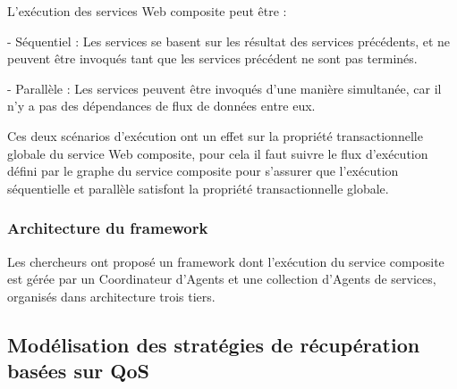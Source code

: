 L'exécution des services Web composite peut être \cite{3} : 

- Séquentiel : Les services se basent sur les résultat des services précédents, et ne peuvent être invoqués tant que les services précédent ne sont pas terminés.

- Parallèle : Les services peuvent être invoqués d'une manière simultanée, car il n'y a pas des dépendances de flux de données entre eux.

Ces deux scénarios d'exécution ont un effet sur la propriété transactionnelle globale du service Web composite, pour cela il faut suivre le flux d'exécution défini par le graphe du service composite pour s'assurer que l'exécution séquentielle et parallèle satisfont la propriété transactionnelle globale.

\subsubsection{Architecture du framework}

Les chercheurs ont proposé un framework dont l'exécution du service composite est gérée par un Coordinateur d'Agents et une collection d'Agents de services, organisés dans architecture trois tiers.




\subsection{Modélisation des stratégies de récupération basées sur QoS}




